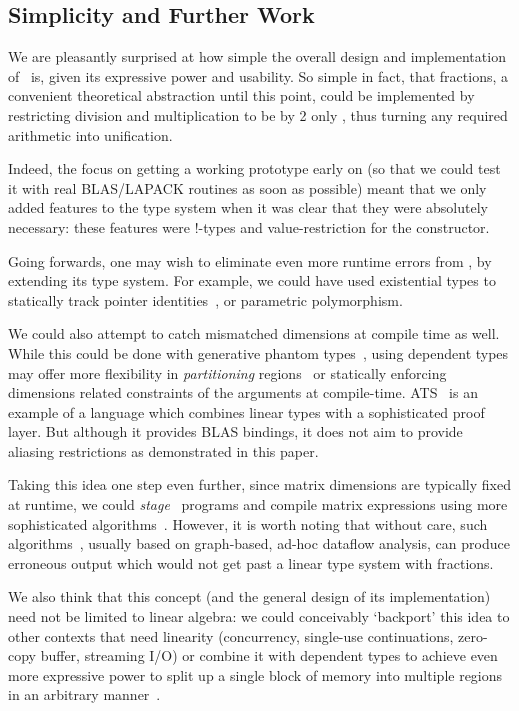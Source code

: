 \subsection{Simplicity and Further Work}

We are pleasantly surprised at how simple the overall design and implementation
of \lang\ is, given its expressive power and usability.  So simple in fact,
that fractions, a convenient theoretical abstraction until this point, could be
implemented by restricting division and multiplication to be by 2 only
\cite{boyland2003}, thus turning any required arithmetic into unification.

Indeed, the focus on getting a working prototype early on (so that we could
test it with real BLAS/LAPACK routines as soon as possible) meant that we only
added features to the type system when it was clear that they were absolutely
necessary: these features were !-types and value-restriction for the
 constructor. 

Going forwards, one may wish to eliminate even more runtime errors from \lang,
by extending its type system. For example, we could have used existential types
to statically track pointer identities~\cite{ahmed20073}, or parametric
polymorphism.

We could also attempt to catch mismatched dimensions at compile time as well.
While this could be done with generative phantom types~\cite{abe2015simple},
using dependent types may offer more flexibility in \emph{partitioning}
regions~\cite{space_monads} or statically enforcing dimensions related
constraints of the arguments at compile-time.  ATS~\cite{cui2005ats} is an
example of a language which combines linear types with a sophisticated proof
layer. But although it provides BLAS bindings, it does not aim to provide
aliasing restrictions as demonstrated in this paper.

Taking this idea one step even further, since matrix dimensions are typically
fixed at runtime, we could \emph{stage} \lang\ programs and compile matrix
expressions using more sophisticated algorithms~\cite{barthels}. However, it is
worth noting that without care, such algorithms~\cite{rocklin_thesis}, usually
based on graph-based, ad-hoc dataflow analysis, can produce erroneous output
which would not get past a linear type system with fractions.

We also think that this concept (and the general design of its implementation)
need not be limited to linear algebra: we could conceivably `backport' this
idea to other contexts that need linearity (concurrency, single-use
continuations, zero-copy buffer, streaming I/O) or combine it with dependent
types to achieve even more expressive power to split up a single block of
memory into multiple regions in an arbitrary manner~\cite{space_monads}.
